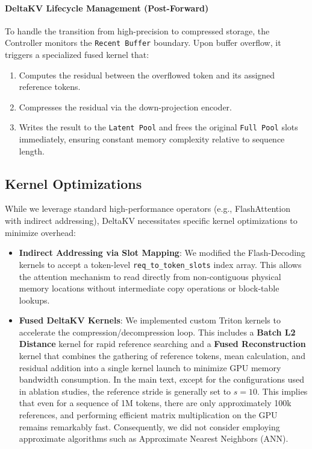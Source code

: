 \paragraph{DeltaKV Lifecycle Management (Post-Forward)}
To handle the transition from high-precision to compressed storage, the Controller monitors the \texttt{Recent Buffer} boundary. Upon buffer overflow, it triggers a specialized fused kernel that:
\begin{enumerate}[nolistsep,label*=(\arabic*)]
  \item Computes the residual between the overflowed token and its assigned reference tokens.
  
  \item Compresses the residual via the down-projection encoder.
  
  \item Writes the result to the \texttt{Latent Pool} and frees the original \texttt{Full Pool} slots immediately, ensuring constant memory complexity relative to sequence length.
\end{enumerate}



\subsection{Kernel Optimizations}
\label{app:sparse_vllm:optimizations}

While we leverage standard high-performance operators (e.g., FlashAttention with indirect addressing), DeltaKV necessitates specific kernel optimizations to minimize overhead:

\begin{itemize}[nolistsep, left=0pt]
  \item \textbf{Indirect Addressing via Slot Mapping}: We modified the Flash-Decoding kernels to accept a token-level \texttt{req\_to\_token\_slots} index array. This allows the attention mechanism to read directly from non-contiguous physical memory locations without intermediate copy operations or block-table lookups.
  
  \item \textbf{Fused DeltaKV Kernels}: We implemented custom Triton kernels to accelerate the compression/decompression loop. This includes a \textbf{Batch L2 Distance} kernel for rapid reference searching and a \textbf{Fused Reconstruction} kernel that combines the gathering of reference tokens, mean calculation, and residual addition into a single kernel launch to minimize GPU memory bandwidth consumption. In the main text, except for the configurations used in ablation studies, the reference stride is generally set to $s=10$. This implies that even for a sequence of 1M tokens, there are only approximately 100k references, and performing efficient matrix multiplication on the GPU remains remarkably fast. Consequently, we did not consider employing approximate algorithms such as Approximate Nearest Neighbors (ANN).
\end{itemize}


